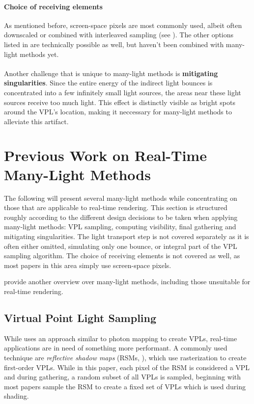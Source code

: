 \paragraph{Choice of receiving elements}
As mentioned before, screen-space pixels are most commonly used, albeit often downscaled or combined with interleaved sampling (see ). The other options listed in  are technically possible as well, but haven't been combined with many-light methods yet.
\\
\\
Another challenge that is unique to many-light methods is \textbf{mitigating singularities}. Since the entire energy of the indirect light bounces is concentrated into a few infinitely small light sources, the areas near these light sources receive too much light. This effect is distinctly visible as bright spots around the VPL's location, making it neccessary for many-light methods to alleviate this artifact.



\section{Previous Work on Real-Time Many-Light Methods}
\label{sec:intro:relatedWorkManyLight}

The following will present several many-light methods while concentrating on those that are applicable to real-time rendering. This section is structured roughly according to the different design decisions to be taken when applying many-light methods: VPL sampling, computing visibility, final gathering and mitigating singularities. The light transport step is not covered separately as it is often either omitted, simulating only one bounce, or integral part of the VPL sampling algorithm. The choice of receiving elements is not covered as well, as most papers in this area simply use screen-space pixels.

\citet{Dachsbacher:2014:ManyLightsSTAR} provide another overview over many-light methods, including those unsuitable for real-time rendering.


\subsection{Virtual Point Light Sampling}
\label{sec:intro:relatedWorkManyLight:vplSampling}

While \citet{Keller:1997:InstantRadiosity} uses an approach similar to photon mapping to create VPLs, real-time applications are in need of something more performant. A commonly used technique are \emph{reflective shadow maps} (RSMs, \cite{Dachsbacher:2005:RSM}), which use rasterization to create first-order VPLs. While in this paper, each pixel of the RSM is considered a VPL and during gathering, a random subset of all VPLs is sampled, beginning with \citet{dachsbacher2006splatting} most papers sample the RSM to create a fixed set of VPLs which is used during shading.

